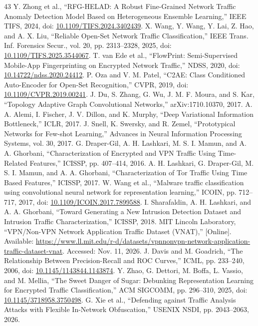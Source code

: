 \documentclass[journal]{IEEEtran}
\begin{document}
\begin{thebibliography}{43}
 Y. Zhong et al., ``RFG-HELAD: A Robust Fine-Grained Network Traffic Anomaly Detection Model Based on Heterogeneous Ensemble Learning,'' IEEE TIFS, 2024, doi: \url{10.1109/TIFS.2024.3402439}.
 X. Wang, Y. Wang, Y. Lai, Z. Hao, and A. X. Liu, ``Reliable Open-Set Network Traffic Classification,'' IEEE Trans. Inf. Forensics Secur., vol. 20, pp. 2313--2328, 2025, doi: \url{10.1109/TIFS.2025.3544067}.
 T. van Ede et al., ``FlowPrint: Semi-Supervised Mobile-App Fingerprinting on Encrypted Network Traffic,'' NDSS, 2020, doi: \url{10.14722/ndss.2020.24412}.
 P. Oza and V. M. Patel, ``C2AE: Class Conditioned Auto-Encoder for Open-Set Recognition,'' CVPR, 2019, doi: \url{10.1109/CVPR.2019.00241}.
 J. Du, S. Zhang, G. Wu, J. M. F. Moura, and S. Kar, ``Topology Adaptive Graph Convolutional Networks,'' arXiv:1710.10370, 2017.
 A. A. Alemi, I. Fischer, J. V. Dillon, and K. Murphy, ``Deep Variational Information Bottleneck,'' ICLR, 2017.
 J. Snell, K. Swersky, and R. Zemel, ``Prototypical Networks for Few-shot Learning,'' Advances in Neural Information Processing Systems, vol. 30, 2017.
 G. Draper-Gil, A. H. Lashkari, M. S. I. Mamun, and A. A. Ghorbani, ``Characterization of Encrypted and VPN Traffic Using Time-Related Features,'' ICISSP, pp. 407--414, 2016.
 A. H. Lashkari, G. Draper-Gil, M. S. I. Mamun, and A. A. Ghorbani, ``Characterization of Tor Traffic Using Time Based Features,'' ICISSP, 2017.
 W. Wang et al., ``Malware traffic classification using convolutional neural network for representation learning,'' ICOIN, pp. 712--717, 2017, doi: \url{10.1109/ICOIN.2017.7899588}.
 I. Sharafaldin, A. H. Lashkari, and A. A. Ghorbani, ``Toward Generating a New Intrusion Detection Dataset and Intrusion Traffic Characterization,'' ICISSP, 2018.
 MIT Lincoln Laboratory, ``VPN/Non-VPN Network Application Traffic Dataset (VNAT),'' [Online]. Available: \url{https://www.ll.mit.edu/r-d/datasets/vpnnonvpn-network-application-traffic-dataset-vnat}. Accessed: Nov. 11, 2026.
 J. Davis and M. Goadrich, ``The Relationship Between Precision-Recall and ROC Curves,'' ICML, pp. 233--240, 2006, doi: \url{10.1145/1143844.1143874}.
 Y. Zhao, G. Dettori, M. Boffa, L. Vassio, and M. Mellia, ``The Sweet Danger of Sugar: Debunking Representation Learning for Encrypted Traffic Classification,'' ACM SIGCOMM, pp. 296--310, 2025, doi: \url{10.1145/3718958.3750498}.
 G. Xie et al., ``Defending against Traffic Analysis Attacks with Flexible In-Network Obfuscation,'' USENIX NSDI, pp. 2043--2063, 2026.
\end{thebibliography}
\end{document}
